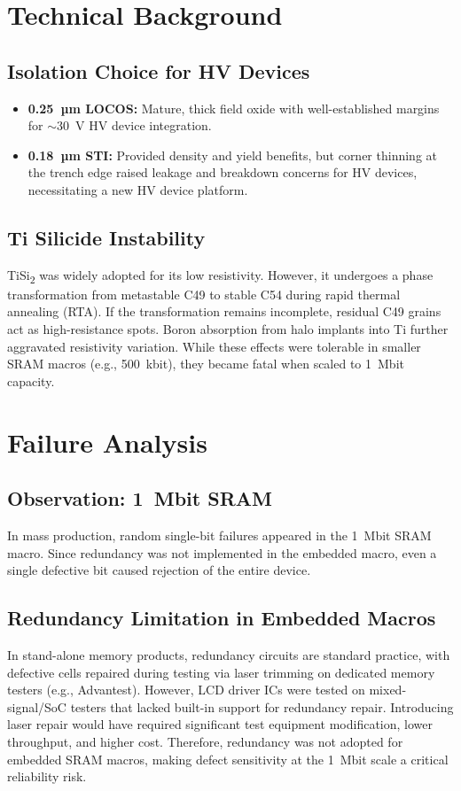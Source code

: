 \documentclass[conference]{IEEEtran}
\begin{document}
\section{Technical Background}
\subsection{Isolation Choice for HV Devices}
\begin{itemize}
    \item \textbf{0.25~µm LOCOS:} Mature, thick field oxide with well-established margins for $\sim$30~V HV device integration.
    \item \textbf{0.18~µm STI:} Provided density and yield benefits, but corner thinning at the trench edge raised leakage and breakdown concerns for HV devices, necessitating a new HV device platform.
\end{itemize}

\subsection{Ti Silicide Instability}
TiSi\textsubscript{2} was widely adopted for its low resistivity. However, it undergoes a phase transformation from metastable C49 to stable C54 during rapid thermal annealing (RTA).  
If the transformation remains incomplete, residual C49 grains act as high-resistance spots.  
Boron absorption from halo implants into Ti further aggravated resistivity variation.  
While these effects were tolerable in smaller SRAM macros (e.g., 500~kbit), they became fatal when scaled to 1~Mbit capacity.

\section{Failure Analysis}
\subsection{Observation: 1~Mbit SRAM}
In mass production, random single-bit failures appeared in the 1~Mbit SRAM macro. Since redundancy was not implemented in the embedded macro, even a single defective bit caused rejection of the entire device.

\subsection{Redundancy Limitation in Embedded Macros}
In stand-alone memory products, redundancy circuits are standard practice, with defective cells repaired during testing via laser trimming on dedicated memory testers (e.g., Advantest).  
However, LCD driver ICs were tested on mixed-signal/SoC testers that lacked built-in support for redundancy repair.  
Introducing laser repair would have required significant test equipment modification, lower throughput, and higher cost.  
Therefore, redundancy was not adopted for embedded SRAM macros, making defect sensitivity at the 1~Mbit scale a critical reliability risk.
\end{document}
